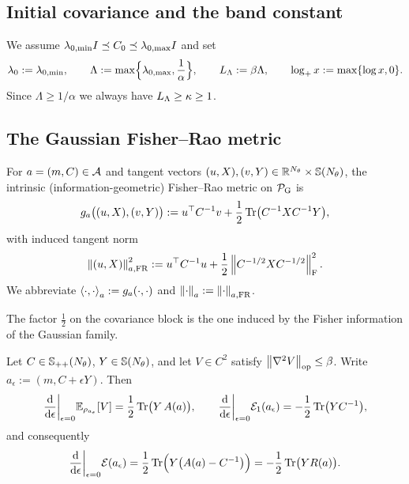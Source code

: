 \subsection{Initial covariance and the band constant}

We assume $\lambda_{0,\min}I\preceq C_0\preceq\lambda_{0,\max}I$ and set
\begin{equation}
\label{eq:Lambda}
    \lambda_0:=\lambda_{0,\min},
    \qquad
    \Lambda:=\max\Bigl\{\lambda_{0,\max},\frac1\alpha\Bigr\},
    \qquad
    L_\Lambda:=\beta\Lambda,
    \qquad
    \log_+ x:=\max\{\log x,0\}.
\end{equation}
Since $\Lambda\geq1/\alpha$ we always have $L_\Lambda\geq\kappa\geq1$.

\subsection{The Gaussian Fisher--Rao metric}
\label{sec:metric}

\begin{definition}
\label{def:FR-metric}
For $a=(m,C)\in\mathcal{A}$ and tangent vectors
$(u,X),(v,Y)\in\mathbb{R}^{N_\theta}\times\mathbb{S}(N_\theta)$, the intrinsic (information-geometric)
Fisher--Rao metric on $\mathcal{P}_{\mathrm G}$ is
\begin{equation}
\label{eq:FR-metric}
    g_a\bigl((u,X),(v,Y)\bigr)
    :=
    u^\top C^{-1}v+\frac12\operatorname{Tr}\bigl(C^{-1}XC^{-1}Y\bigr),
\end{equation}
with induced tangent norm
\begin{equation}
\label{eq:tangent-norm}
    \left\lVert (u,X)\right\rVert_{a,\mathrm{FR}}^2
    :=
    u^\top C^{-1}u+\frac12\left\lVert C^{-1/2}XC^{-1/2}\right\rVert_{\mathrm{F}}^2 .
\end{equation}
We abbreviate $\left\langle \cdot,\cdot\right\rangle_a:=g_a(\cdot,\cdot)$ and $\left\lVert \cdot\right\rVert_a:=\left\lVert \cdot\right\rVert_{a,\mathrm{FR}}$.
\end{definition}

The factor $\tfrac12$ on the covariance block is the one induced by the Fisher information of the
Gaussian family.

\begin{lemma}
\label{lem:price-derivative}
Let $C\in\mathbb{S}_{++}(N_\theta)$, $Y\in\mathbb{S}(N_\theta)$, and let $V\in C^2$ satisfy
$\left\lVert \nabla^2V\right\rVert_{\mathrm{op}}\leq\beta$. Write $a_\epsilon:=(m,C+\epsilon Y)$. Then
\begin{equation}
\label{eq:price-directional}
    \frac{\mathrm{d}}{\mathrm{d}\epsilon}\bigg|_{\epsilon=0}\mathbb{E}_{\rho_{a_\epsilon}}[V]
    =\frac12\operatorname{Tr}\bigl(Y\,A(a)\bigr),
    \qquad
    \frac{\mathrm{d}}{\mathrm{d}\epsilon}\bigg|_{\epsilon=0}\mathcal{E}_1(a_\epsilon)
    =-\frac12\operatorname{Tr}\bigl(YC^{-1}\bigr),
\end{equation}
and consequently
\begin{equation}
\label{eq:E-directional}
    \frac{\mathrm{d}}{\mathrm{d}\epsilon}\bigg|_{\epsilon=0}\mathcal{E}(a_\epsilon)
    =\frac12\operatorname{Tr}\Bigl(Y\bigl(A(a)-C^{-1}\bigr)\Bigr)
    =-\frac12\operatorname{Tr}\bigl(Y R(a)\bigr).
\end{equation}
\end{lemma}


